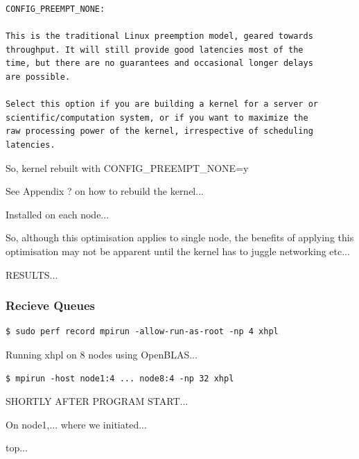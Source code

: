 \documentclass{report}
\begin{document}
\lstset{style=listing}
\begin{lstlisting}[numbers=none, caption=Kernel Configuration Preemption Model Help]
CONFIG_PREEMPT_NONE:                                                                                                                                                                                                                                                 

This is the traditional Linux preemption model, geared towards
throughput. It will still provide good latencies most of the
time, but there are no guarantees and occasional longer delays
are possible.                                                                                                                       

Select this option if you are building a kernel for a server or
scientific/computation system, or if you want to maximize the
raw processing power of the kernel, irrespective of scheduling
latencies.
\end{lstlisting}

So, kernel rebuilt with CONFIG\_PREEMPT\_NONE=y

See Appendix ? on how to rebuild the kernel...

Installed on each node...

So, although this optimisation applies to  single node, the benefits of applying this optimisation may not be apparent until the kernel has to juggle networking etc...

RESULTS...


%
%
\subsubsection{Recieve Queues}

\lstset{style=type}
\begin{lstlisting}
$ sudo perf record mpirun -allow-run-as-root -np 4 xhpl
\end{lstlisting}



Running xhpl on 8 nodes using OpenBLAS...

\lstset{style=type}
\begin{lstlisting}
$ mpirun -host node1:4 ... node8:4 -np 32 xhpl
\end{lstlisting}


SHORTLY AFTER PROGRAM START...

On node1,... where we initiated...

top...
\end{document}
